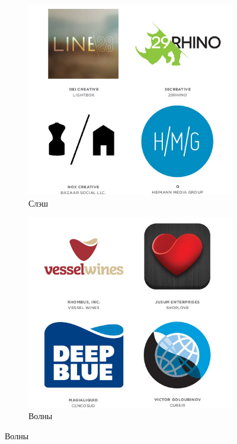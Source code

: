 \begin{figure}[h!]
  \vfill

  \centering
  \begin{subfigure}{.45\textwidth}
    \centering
    \includegraphics[width=\linewidth]{images/supplement/logolounge/2013/Slesh}
    \caption{Слэш}
    \label{fig:logolounge:2013:slesh}
  \end{subfigure}
  \hfill
  \centering
  \begin{subfigure}{.45\textwidth}
    \centering
    \includegraphics[width=\linewidth]{images/supplement/logolounge/2013/Volni}
    \caption{Волны}
    \label{fig:logolounge:2013:volni}
  \end{subfigure}
\end{figure}

